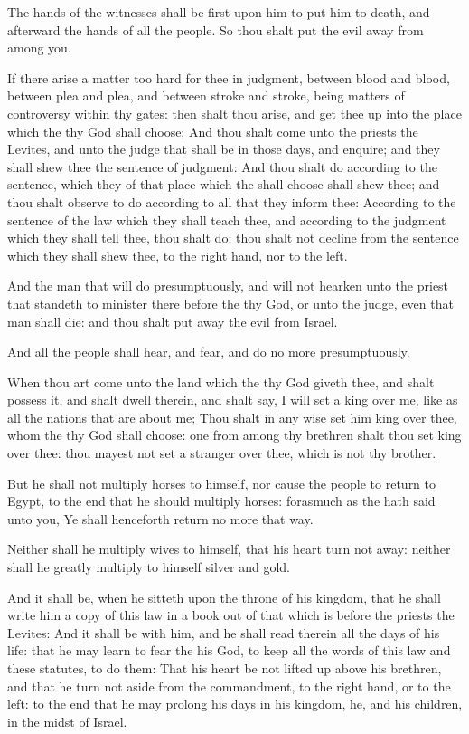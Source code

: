 \Verse The hands of the witnesses shall be first upon him to put him to death, and afterward the hands of all the people. So thou shalt put the evil away from among you.

\Verse If there arise a matter too hard for thee in judgment, between blood and blood, between plea and plea, and between stroke and stroke, being matters of controversy within thy gates: then shalt thou arise, and get thee up into the place which the \LORD thy God shall choose; \Verse And thou shalt come unto the priests the Levites, and unto the judge that shall be in those days, and enquire; and they shall shew thee the sentence of judgment: \Verse And thou shalt do according to the sentence, which they of that place which the \LORD shall choose shall shew thee; and thou shalt observe to do according to all that they inform thee: \Verse According to the sentence of the law which they shall teach thee, and according to the judgment which they shall tell thee, thou shalt do: thou shalt not decline from the sentence which they shall shew thee, to the right hand, nor to the left.

\Verse And the man that will do presumptuously, and will not hearken unto the priest that standeth to minister there before the \LORD thy God, or unto the judge, even that man shall die: and thou shalt put away the evil from Israel.

\Verse And all the people shall hear, and fear, and do no more presumptuously.

\Verse When thou art come unto the land which the \LORD thy God giveth thee, and shalt possess it, and shalt dwell therein, and shalt say, I will set a king over me, like as all the nations that are about me; \Verse Thou shalt in any wise set him king over thee, whom the \LORD thy God shall choose: one from among thy brethren shalt thou set king over thee: thou mayest not set a stranger over thee, which is not thy brother.

\Verse But he shall not multiply horses to himself, nor cause the people to return to Egypt, to the end that he should multiply horses: forasmuch as the \LORD hath said unto you, Ye shall henceforth return no more that way.

\Verse Neither shall he multiply wives to himself, that his heart turn not away: neither shall he greatly multiply to himself silver and gold.

\Verse And it shall be, when he sitteth upon the throne of his kingdom, that he shall write him a copy of this law in a book out of that which is before the priests the Levites: \Verse And it shall be with him, and he shall read therein all the days of his life: that he may learn to fear the \LORD his God, to keep all the words of this law and these statutes, to do them: \Verse That his heart be not lifted up above his brethren, and that he turn not aside from the commandment, to the right hand, or to the left: to the end that he may prolong his days in his kingdom, he, and his children, in the midst of Israel.


